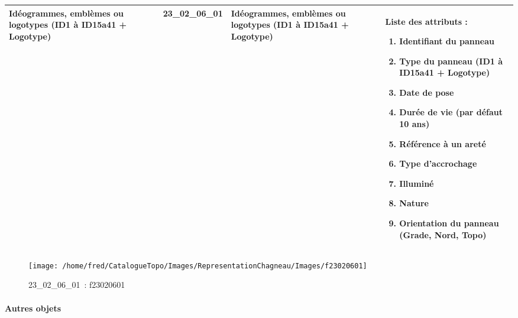 \documentclass[12pt,titlepage]{book}
\begin{document}
\renewcommand{\arraystretch}{1.2}
\begin{supertabular}{|p{10cm}|c|p{13cm}|p{12cm}|}
 Idéogrammes, emblèmes ou logotypes (ID1 à ID15a41 + Logotype) & 23\_02\_06\_01 & Idéogrammes, emblèmes ou logotypes (ID1 à ID15a41 + Logotype) & Liste des attributs :
\begin{enumerate}
  \item Identifiant du panneau  \item Type du panneau (ID1 à ID15a41 + Logotype)  \item Date de pose  \item Durée de vie (par défaut 10 ans)  \item Référence à un areté  \item Type d'accrochage  \item Illuminé  \item Nature  \item Orientation du panneau (Grade, Nord, Topo)\end{enumerate}
\\
\hline
\end{supertabular}
\begin{figure}[h!]
  \hfill         %
  \begin{minipage}[t]{3cm}
    \begin{center}
      \texttt{[image: /home/fred/CatalogueTopo/Images/RepresentationChagneau/Images/f23020601]}
      \caption[~23\_02\_06\_01]{\small{23\_02\_06\_01~:} \tiny{f23020601}}\label{f23020601}
    \end{center}
  \end{minipage}
\end{figure}


\paragraph{Autres objets}
\noindent
\vspace{\baselineskip}
\end{document}
